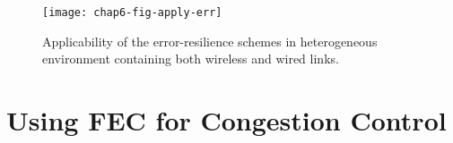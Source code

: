 \begin{figure}
\centerline {
\texttt{[image: chap6-fig-apply-err]}
}
\caption{Applicability of the error-resilience schemes in heterogeneous
environment containing both wireless and wired links.}
\label{fig:apply_err}
\end{figure}


\section{Using FEC for Congestion Control}


\begin{figure}
  \centerline{
}
\caption{}
\label{fig:fecrc-intro}
\end{figure}


\begin{figure}[!t]
  \centerline{
}
\caption{}
\label{fig:fecrc-var}
\end{figure}

